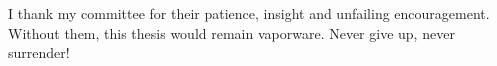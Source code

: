I thank my committee for their patience, insight and unfailing encouragement. Without them, this thesis would remain vaporware. Never give up, never surrender!